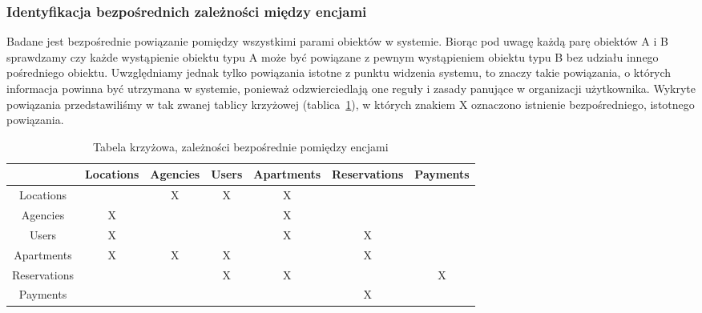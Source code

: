 \documentclass[polish, 11pt]{article}
\begin{document}
        \subsubsection{Identyfikacja bezpośrednich zależności między encjami}
            Badane jest bezpośrednie powiązanie pomiędzy wszystkimi parami obiektów w systemie.
            Biorąc pod uwagę każdą parę obiektów A i B sprawdzamy czy każde wystąpienie obiektu typu A
            może być powiązane z pewnym wystąpieniem obiektu typu B bez udziału innego pośredniego obiektu.
            Uwzględniamy jednak tylko powiązania istotne z punktu widzenia systemu,
            to znaczy takie powiązania, o których informacja powinna być utrzymana w systemie,
            ponieważ odzwierciedlają one reguły i zasady panujące w organizacji użytkownika.
            Wykryte powiązania przedstawiliśmy w tak zwanej tablicy krzyżowej (tablica~\ref{tab:cross}),
            w których znakiem X oznaczono istnienie bezpośredniego, istotnego powiązania.
            \begin{table}[h]
                \centering
                \caption{Tabela krzyżowa, zależności bezpośrednie pomiędzy encjami}\label{tab:cross}
                \begin{tabular}{ccccccc}\toprule
                    &	Locations	&	Agencies	&	Users	&	Apartments	&	Reservations	&	Payments	\\\midrule
                    Locations	    &		&	X	&	X	&	X	&		&		\\
                    Agencies	    &	X	&		&		&	X	&		&		\\
                    Users	        &	X	&		&		&	X	&	X	&		\\
                    Apartments	    &	X	&	X	&	X	&		&	X	&		\\
                    Reservations	&		&		&	X	&	X	&		&	X	\\
                    Payments	    &		&		&		&		&	X	&		\\
                \bottomrule
                \end{tabular}
            \end{table}
\end{document}
